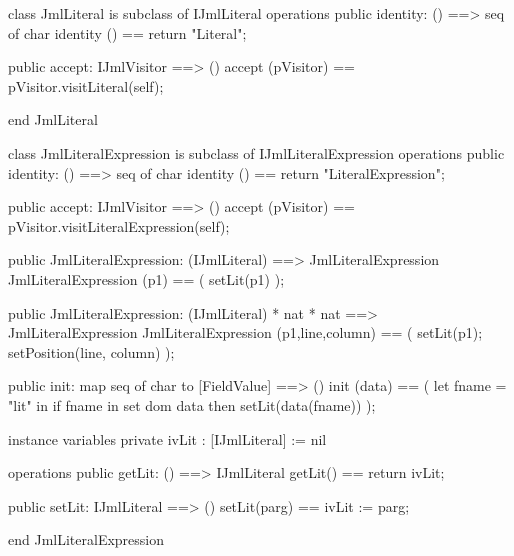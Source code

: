 \begin{vdm_al}
class JmlLiteral is subclass of IJmlLiteral
operations
  public identity: () ==> seq of char
  identity () == return "Literal";

  public accept: IJmlVisitor ==> ()
  accept (pVisitor) == pVisitor.visitLiteral(self);

end JmlLiteral
\end{vdm_al}
\begin{vdm_al}
class JmlLiteralExpression is subclass of IJmlLiteralExpression
operations
  public identity: () ==> seq of char
  identity () == return "LiteralExpression";

  public accept: IJmlVisitor ==> ()
  accept (pVisitor) == pVisitor.visitLiteralExpression(self);

  public JmlLiteralExpression:
    (IJmlLiteral) ==> JmlLiteralExpression
  JmlLiteralExpression (p1) == 
    ( setLit(p1) );

  public JmlLiteralExpression:
    (IJmlLiteral) *
    nat *
    nat ==> JmlLiteralExpression
  JmlLiteralExpression (p1,line,column) == 
    ( setLit(p1);
      setPosition(line, column) );

  public init: map seq of char to [FieldValue] ==> ()
  init (data) ==
    ( let fname = "lit" in
        if fname in set dom data
        then setLit(data(fname)) );

instance variables
  private ivLit : [IJmlLiteral] := nil

operations
  public getLit: () ==> IJmlLiteral
  getLit() == return ivLit;

  public setLit: IJmlLiteral ==> ()
  setLit(parg) == ivLit := parg;

end JmlLiteralExpression
\end{vdm_al}

